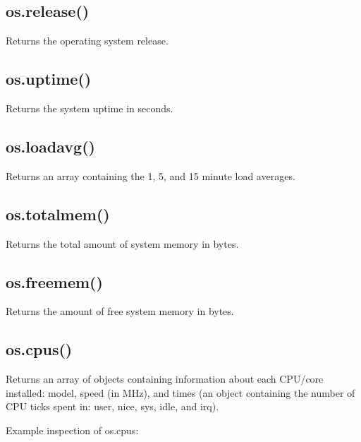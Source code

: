 \subsection{os.release()}

Returns the operating system release.

\subsection{os.uptime()}

Returns the system uptime in seconds.

\subsection{os.loadavg()}

Returns an array containing the 1, 5, and 15 minute load averages.

\subsection{os.totalmem()}

Returns the total amount of system memory in bytes.

\subsection{os.freemem()}

Returns the amount of free system memory in bytes.

\subsection{os.cpus()}

Returns an array of objects containing information about each CPU/core
installed: model, speed (in MHz), and times (an object containing the
number of CPU ticks spent in: user, nice, sys, idle, and irq).

Example inspection of os.cpus:

